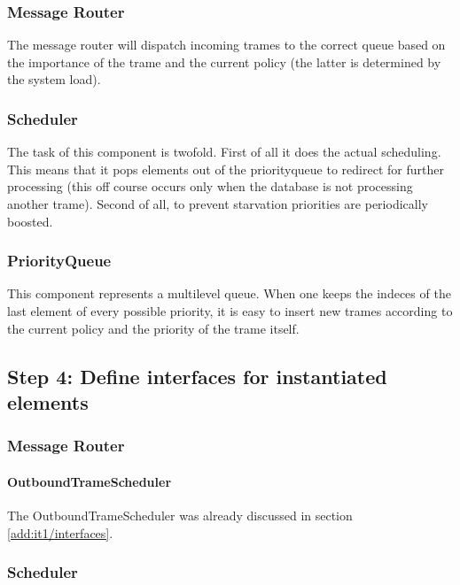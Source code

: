 \subsubsection{Message Router}

\npar The message router will dispatch incoming trames to the correct queue
based on the importance of the trame and the current policy (the latter is
determined by the system load). 

\subsubsection{Scheduler}

\npar The task of this component is twofold. First of all it does the actual
scheduling. This means that it pops elements out of the priorityqueue to
redirect for further processing (this off course occurs only when the database
is not processing another trame). Second of all, to prevent starvation
priorities are periodically boosted.

\subsubsection{PriorityQueue}

\npar This component represents a multilevel queue. When one keeps the indeces
of the last element of every possible priority, it is easy to insert new trames
according to the current policy and the priority of the trame itself.

\subsection{Step 4: Define interfaces for instantiated elements}
\label{add:it6/interfaces}

\subsubsection{Message Router}

\paragraph{OutboundTrameScheduler}

\npar The OutboundTrameScheduler was already discussed in section
\ref{add:it1/interfaces}.

\subsubsection{Scheduler}

